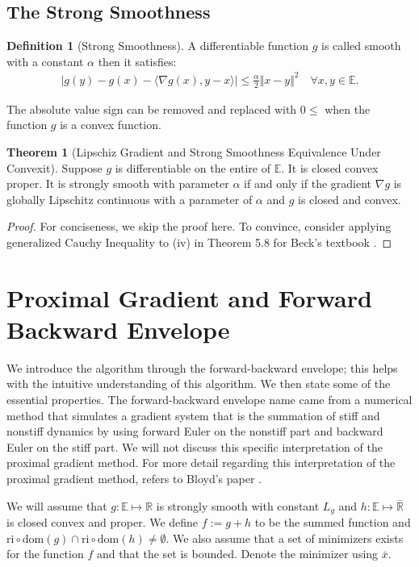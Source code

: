 \documentclass[]{article}
\theoremstyle{definition}
\newtheorem{theorem}{Theorem}       %
\newtheorem{definition}{Definition}
\begin{document}
    \subsection{The Strong Smoothness}
        \begin{definition}[Strong Smoothness]\label{def:strong_smoothness}
            A differentiable function $g$ is called smooth with a constant $\alpha$ then it satisfies: 
            \begin{align}
                |g(y) - g(x) - 
                \langle \nabla g(x), y - x
                \rangle| \le \frac{\alpha}{2}\Vert x - y\Vert^2
                \quad \forall x, y\in \mathbb E. 
            \end{align}    
        \end{definition}
        The absolute value sign can be removed and replaced with $0\le$ when the function $g$ is a convex function.
        \begin{theorem}[Lipschiz Gradient and Strong Smoothness Equivalence Under Convexit]\label{thm:cvx_lipz_grad}
            Suppose $g$ is differentiable on the entire of $\mathbb E$. It is closed convex proper. It is strongly smooth with parameter $\alpha$ if and only if the gradient $\nabla g$ is globally Lipschitz continuous with a parameter of $\alpha$ and $g$ is closed and convex. 
        \end{theorem}
        \begin{proof}
            For conciseness, we skip the proof here. To convince, consider applying generalized Cauchy Inequality to (iv) in Theorem 5.8 for Beck's textbook \cite{paper:FISTA}. 
        \end{proof}
        
\section{Proximal Gradient and Forward Backward Envelope}\label{sec:pg_forward_backward_env}
    We introduce the algorithm through the forward-backward envelope; this helps with the intuitive understanding of this algorithm. We then state some of the essential properties. The forward-backward envelope name came from a numerical method that simulates a gradient system that is the summation of stiff and nonstiff dynamics by using forward Euler on the nonstiff part and backward Euler on the stiff part. We will not discuss this specific interpretation of the proximal gradient method. For more detail regarding this interpretation of the proximal gradient method, refers to Bloyd's paper \cite{paper:bloyd}. 
    \begin{assumption}\label{assumption:1}
        We will assume that $g:\mathbb E\mapsto \mathbb R$ is strongly smooth with constant $L_g$ and $h:\mathbb E \mapsto \bar{\mathbb R}$ is closed convex and proper. We define $f := g + h$ to be the summed function and $\text{ri}\circ \text{dom}(g) \cap \text{ri}\circ \text{dom}(h) \neq \emptyset$. We also assume that a set of minimizers exists for the function $f$ and that the set is bounded. Denote the minimizer using $\bar x$. 
    \end{assumption}
    
\end{document}
